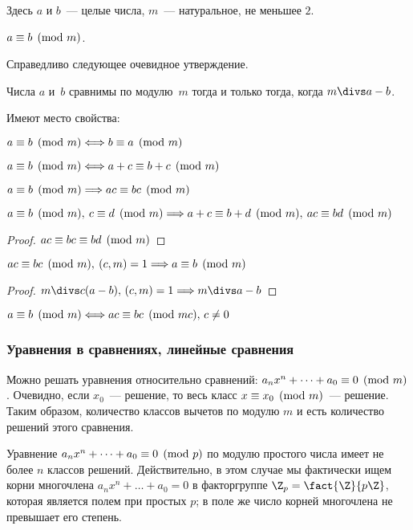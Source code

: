 Здесь $a$ и $b$~— целые числа, $m$~— натуральное, не меньшее $2$.
\begin{denote}
$a \equiv b \pmod m$.
\end{denote}

Справедливо следующее очевидное утверждение.
\begin{stm}
Числа $a$ и~$b$ сравнимы по модулю~$m$ тогда и только тогда, когда $m \divs a-b$.
\end{stm}

Имеют место свойства:
\begin{points}{0}
  \item $a \equiv b \pmod m \Longleftrightarrow b \equiv a \pmod m$\par
  \item $a \equiv b \pmod m \Longleftrightarrow a+c \equiv b+c \pmod m$\par
  \item $a \equiv b \pmod m \Longrightarrow ac \equiv bc \pmod m$\par
  \item $a \equiv b \pmod m,\:c \equiv d \pmod m \Longrightarrow a + c \equiv b + d \pmod m,\:
		ac \equiv bd \pmod m$ 
\begin{proof}
	$ac \equiv bc \equiv bd \pmod m$
\end{proof}
  \item $ac \equiv bc \pmod m,\:(c,m) = 1 \Longrightarrow a \equiv b \pmod m$
\begin{proof}
  $m \divs c(a - b),\,(c,m) = 1 \lRa m \divs a - b$
\end{proof}

	\item $a \equiv b \pmod m \Longleftrightarrow ac \equiv bc \pmod{mc},\,c \neq 0$
\end{points}

\subsubsection{Уравнения в сравнениях, линейные сравнения}

Можно решать уравнения относительно сравнений: 
$a_nx^n + \dots + a_0 \equiv 0 \pmod m$. Очевидно, если $x_0$~— решение, то 
весь класс $x \equiv x_0 \pmod m$~— решение. Таким образом, количество классов 
вычетов по модулю $m$ и есть количество решений этого сравнения.

Уравнение $a_nx^n + \dots + a_0 \equiv 0 \pmod p $ по модулю
простого числа имеет не более $n$ классов решений. Действительно, в этом случае
мы фактически ищем корни многочлена $a_nx^n + \dots + a_0 = 0$ в факторгруппе 
$\Z_p=\fact{\Z}{p\Z}$, которая является полем при простых $p$; в поле же число 
корней многочлена не превышает его степень.

